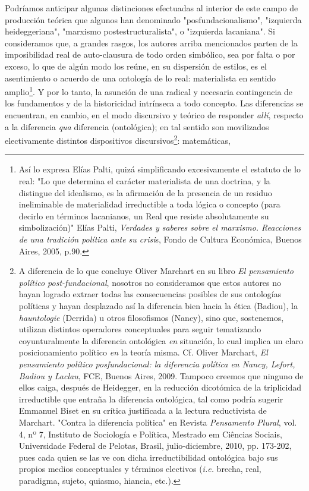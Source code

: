 \documentclass{book}
\begin{document}
Podríamos anticipar algunas distinciones efectuadas al interior de este
campo de producción teórica que algunos han denominado
"posfundacionalismo", "izquierda heideggeriana", "marxismo
postestructuralista", o "izquierda lacaniana". Si consideramos que, a
grandes rasgos, los autores arriba mencionados parten de la
imposibilidad real de auto-clausura de todo orden simbólico, sea por
falta o por exceso, lo que de algún modo los reúne, en su dispersión de
estilos, es el asentimiento o acuerdo de una ontología de lo real:
materialista en sentido amplio\footnote{Así lo expresa Elías Palti,
  quizá simplificando excesivamente el estatuto de lo real: "Lo que
  determina el carácter materialista de una doctrina, y la distingue del
  idealismo, es la afirmación de la presencia de un residuo ineliminable
  de materialidad irreductible a toda lógica o concepto (para decirlo en
  términos lacanianos, un Real que resiste absolutamente su
  simbolización)" Elías Palti, \emph{Verdades y saberes sobre el
  marxismo. Reacciones de una tradición política ante su crisi}s, Fondo
  de Cultura Económica, Buenos Aires, 2005, p.90.}. Y por lo tanto, la
asunción de una radical y necesaria contingencia de los fundamentos y de
la historicidad intrínseca a todo concepto. Las diferencias se
encuentran, en cambio, en el modo discursivo y teórico de responder
\emph{allí}, respecto a la diferencia \emph{qua} diferencia
(ontológica); en tal sentido son movilizados electivamente distintos
dispositivos discursivos\footnote{A diferencia de lo que concluye Oliver
  Marchart en su libro \emph{El pensamiento político post-fundacional},
  nosotros no consideramos que estos autores no hayan logrado extraer
  todas las consecuencias posibles de sus ontologías políticas y hayan
  desplazado así la diferencia bien hacia la ética (Badiou), la
  \emph{hauntologie} (Derrida) u otros filosofismos (Nancy), sino que,
  sostenemos, utilizan distintos operadores conceptuales para seguir
  tematizando coyunturalmente la diferencia ontológica \emph{en}
  situación, lo cual implica un claro posicionamiento político \emph{en}
  la teoría misma. Cf. Oliver Marchart, \emph{El pensamiento político
  posfundacional: la diferencia política en Nancy, Lefort, Badiou y
  Laclau}, FCE, Buenos Aires, 2009. Tampoco creemos que ninguno de ellos
  caiga, después de Heidegger, en la reducción dicotómica de la
  triplicidad irreductible que entraña la diferencia ontológica, tal
  como podría sugerir Emmanuel Biset en su crítica justificada a la
  lectura reductivista de Marchart. "Contra la diferencia política" en
  Revista \emph{Pensamento Plural}, vol. 4, nº 7, Instituto de
  Sociología e Política, Mestrado em Ciências Sociais, Universidade
  Federal de Pelotas, Brasil, julio-diciembre, 2010, pp. 173-202, pues
  cada quien se las ve con dicha irreductibilidad ontológica bajo sus
  propios medios conceptuales y términos electivos (\emph{i.e.} brecha,
  real, paradigma, sujeto, quiasmo, hiancia, etc.).}: matemáticas,
\end{document}
